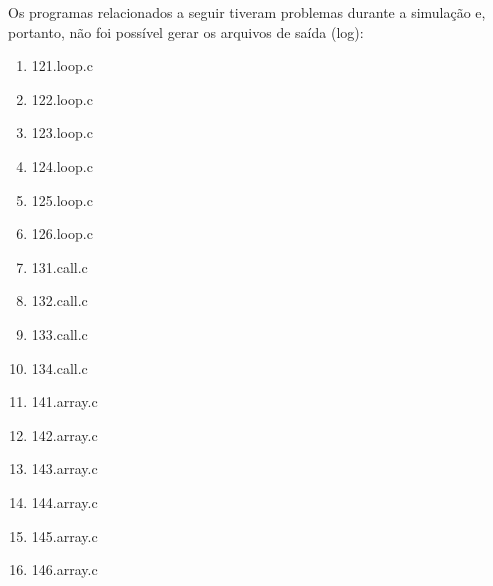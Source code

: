 Os programas relacionados a seguir tiveram problemas durante a simulação e, portanto, não foi possível gerar os arquivos de saída (log): 

\begin{multicols}{4}
    \begin{enumerate}
        \item 121.loop.c
        \item 122.loop.c
        \item 123.loop.c
        \item 124.loop.c
        \item 125.loop.c
        \item 126.loop.c
        \item 131.call.c
        \item 132.call.c
        \item 133.call.c
        \item 134.call.c
        \item 141.array.c
        \item 142.array.c
        \item 143.array.c
        \item 144.array.c
        \item 145.array.c
        \item 146.array.c
    \end{enumerate}
\end{multicols}